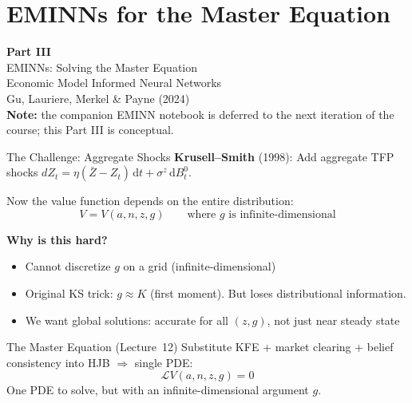 \documentclass[aspectratio=169,11pt]{beamer}
\newcommand{\emphc}[1]{\textcolor{harvardcrimson}{#1}}
\newcommand{\ud}{\,\mathrm{d}}
\begin{document}
\section{EMINNs for the Master Equation}

\begin{frame}{}
\vfill
\begin{center}
{\Huge \textcolor{uzhblue}{\textbf{Part III}}}\\[12pt]
{\LARGE EMINNs: Solving the Master Equation}\\[6pt]
{\large Economic Model Informed Neural Networks}\\[6pt]
{\small Gu, Lauriere, Merkel \& Payne (2024)}\\[10pt]
{\footnotesize \textbf{Note:} the companion EMINN notebook is deferred to the next iteration of the course; this Part III is conceptual.}
\end{center}
\vfill
\end{frame}

\begin{frame}{The Challenge: Aggregate Shocks}
\small
\textbf{Krusell--Smith} (1998): Add aggregate TFP shocks $dZ_t = \eta(\bar{Z}-Z_t)\ud t + \sigma^z\ud B_t^0$.

\vspace{0.2em}
Now the value function depends on the \emphc{entire distribution}:
\[
V = V(a, n, z, g) \qquad \text{where } g \text{ is infinite-dimensional}
\]

\vspace{0.1em}
\textbf{Why is this hard?}
\begin{itemize}\itemsep2pt
    \item Cannot discretize $g$ on a grid (infinite-dimensional)
    \item Original KS trick: $g \approx K$ (first moment). But loses distributional information.
    \item We want \emphc{global} solutions: accurate for all $(z, g)$, not just near steady state
\end{itemize}

\vspace{0.2em}
\begin{block}{The Master Equation (Lecture~12)}
\small
Substitute KFE + market clearing + belief consistency into HJB $\Rightarrow$ \emphc{single PDE}:
\[
\mathcal{L}V(a, n, z, g) = 0
\]
One PDE to solve, but with an infinite-dimensional argument $g$.
\end{block}
\end{frame}
\end{document}
